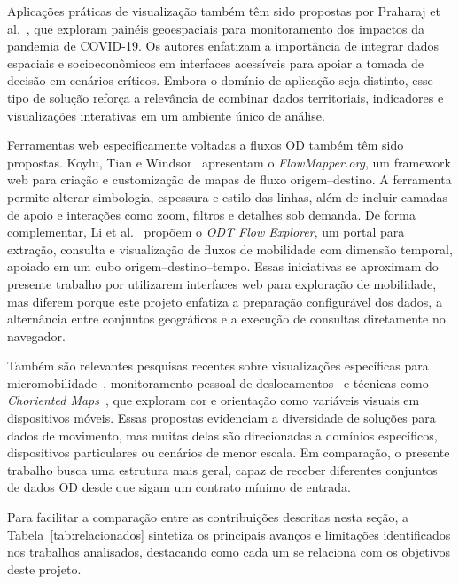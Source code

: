 \documentclass[12pt]{article}
\begin{document}
Aplicações práticas de visualização também têm sido propostas por Praharaj et al.~\cite{Praharaj}, que exploram painéis geoespaciais para monitoramento dos impactos da pandemia de COVID-19. Os autores enfatizam a importância de integrar dados espaciais e socioeconômicos em interfaces acessíveis para apoiar a tomada de decisão em cenários críticos. Embora o domínio de aplicação seja distinto, esse tipo de solução reforça a relevância de combinar dados territoriais, indicadores e visualizações interativas em um ambiente único de análise.

Ferramentas web especificamente voltadas a fluxos OD também têm sido propostas. Koylu, Tian e Windsor~\cite{koylu2021flowmapper} apresentam o \textit{FlowMapper.org}, um framework web para criação e customização de mapas de fluxo origem--destino. A ferramenta permite alterar simbologia, espessura e estilo das linhas, além de incluir camadas de apoio e interações como zoom, filtros e detalhes sob demanda. De forma complementar, Li et al.~\cite{li2020odtflowexplorer} propõem o \textit{ODT Flow Explorer}, um portal para extração, consulta e visualização de fluxos de mobilidade com dimensão temporal, apoiado em um cubo origem--destino--tempo. Essas iniciativas se aproximam do presente trabalho por utilizarem interfaces web para exploração de mobilidade, mas diferem porque este projeto enfatiza a preparação configurável dos dados, a alternância entre conjuntos geográficos e a execução de consultas diretamente no navegador.

Também são relevantes pesquisas recentes sobre visualizações específicas para micromobilidade~\cite{Koktavá_Horák_2023}, monitoramento pessoal de deslocamentos~\cite{Nelson04052023} e técnicas como \textit{Choriented Maps}~\cite{Gorte02012022}, que exploram cor e orientação como variáveis visuais em dispositivos móveis. Essas propostas evidenciam a diversidade de soluções para dados de movimento, mas muitas delas são direcionadas a domínios específicos, dispositivos particulares ou cenários de menor escala. Em comparação, o presente trabalho busca uma estrutura mais geral, capaz de receber diferentes conjuntos de dados OD desde que sigam um contrato mínimo de entrada.

Para facilitar a comparação entre as contribuições descritas nesta seção, a Tabela~\ref{tab:relacionados} sintetiza os principais avanços e limitações identificados nos trabalhos analisados, destacando como cada um se relaciona com os objetivos deste projeto.
\end{document}
